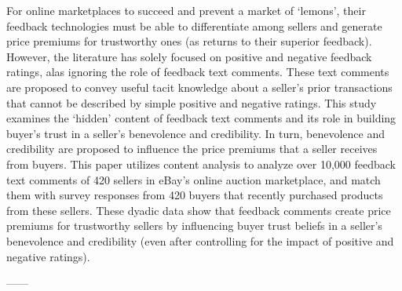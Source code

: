 \documentclass[a4paper, 11pt]{article}
\begin{document}
For online marketplaces to succeed and prevent a market of ‘lemons’, their feedback technologies must be able to
differentiate among sellers and generate price premiums for trustworthy ones (as returns to their superior feedback).
However, the literature has solely focused on positive and negative feedback ratings, alas ignoring the role of
feedback text comments. These text comments are proposed to convey useful tacit knowledge about a seller’s prior
transactions that cannot be described by simple positive and negative ratings. This study examines the ‘hidden’
content of feedback text comments and its role in building buyer’s trust in a seller’s benevolence and credibility. In
turn, benevolence and credibility are proposed to influence the price premiums that a seller receives from buyers. \cite{palou institutional}
This paper utilizes content analysis to analyze over 10,000 feedback text comments of 420 sellers in eBay’s online
auction marketplace, and match them with survey responses from 420 buyers that recently purchased products
from these sellers. These dyadic data show that feedback comments create price premiums for trustworthy sellers
by influencing buyer trust beliefs in a seller’s benevolence and credibility (even after controlling for the impact of
positive and negative ratings).

------
\end{document}
